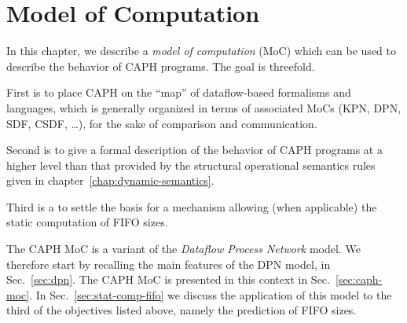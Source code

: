 
\chapter{Model of Computation} \label{cha:moc}

In this chapter, we describe a \emph{model of computation} (MoC) which can be used to describe the
behavior of CAPH programs. The goal is threefold.

\medskip
First is to place CAPH on the ``map'' of dataflow-based formalisms and languages, which is generally
organized in terms of associated MoCs (KPN, DPN, SDF, CSDF, \ldots), for the sake of comparison and
communication. 

Second is to give a formal description of the behavior of CAPH programs at a higher level than
that provided by the structural operational semantics rules given in
chapter~\ref{chap:dynamic-semantics}. 

Third is a to settle the basis for a mechanism allowing (when applicable) the static computation of FIFO
  sizes.

\medskip
The CAPH MoC is a variant of the \emph{Dataflow Process Network} model. We  therefore start by
recalling the main features of the DPN model, in Sec.~\ref{sec:dpn}. The CAPH MoC is presented in
this context in Sec.~\ref{sec:caph-moc}. In Sec.~\ref{sec:stat-comp-fifo} we discuss the application
of this model to the third of the objectives listed above, namely the prediction of FIFO sizes.


